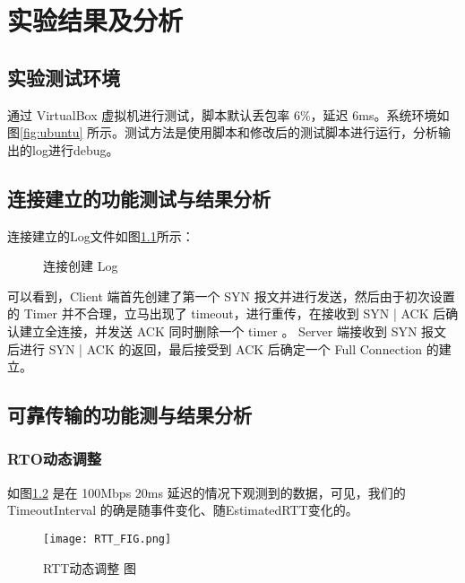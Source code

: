 
\chapter{实验结果及分析}

\section*{实验测试环境}

通过 VirtualBox 虚拟机进行测试，脚本默认丢包率 6\%，延迟 6ms。系统环境如图\ref{fig:ubuntu} 所示。测试方法是使用脚本和修改后的测试脚本进行运行，分析输出的log进行debug。

\section{连接建立的功能测试与结果分析}

连接建立的Log文件如图\ref{fig:established_log}所示：

\begin{figure}[!htbp]
    \centering
    \caption{连接创建 Log }\label{fig:established_log}
  \end{figure}

可以看到，Client 端首先创建了第一个 SYN 报文并进行发送，然后由于初次设置的 Timer 并不合理，立马出现了 timeout，进行重传，在接收到 SYN | ACK 后确认建立全连接，并发送 ACK 同时删除一个 timer 。 Server 端接收到 SYN 报文后进行 SYN | ACK 的返回，最后接受到 ACK 后确定一个 Full Connection 的建立。

\section{可靠传输的功能测与结果分析}

\subsection{RTO动态调整}
如图\ref{fig:RTTFIG} 是在 100Mbps 20ms 延迟的情况下观测到的数据，可见，我们的 TimeoutInterval 的确是随事件变化、随EstimatedRTT变化的。

\begin{figure}[!htbp]
    \centering
    \texttt{[image: RTT\_FIG.png]}
    \caption{RTT动态调整 图}\label{fig:RTTFIG}
\end{figure}


